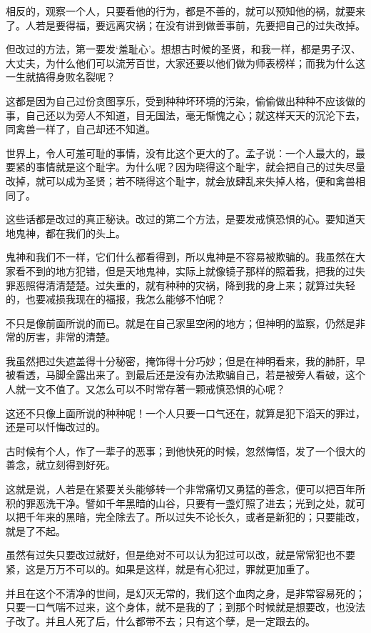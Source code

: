 \documentclass[12pt,twoside,openany]{book}
\begin{document}
相反的，观察一个人，只要看他的行为，都是不善的，就可以预知他的祸，就要来了。人若是要得福，要远离灾祸；在没有讲到做善事前，先要把自己的过失改掉。

但改过的方法，第一要发‘羞耻心’。想想古时候的圣贤，和我一样，都是男子汉、大丈夫，为什么他们可以流芳百世，大家还要以他们做为师表榜样；而我为什么这一生就搞得身败名裂呢？

这都是因为自己过份贪图享乐，受到种种坏环境的污染，偷偷做出种种不应该做的事，自己还以为旁人不知道，目无国法，毫无惭愧之心；就这样天天的沉沦下去，同禽兽一样了，自己却还不知道。

世界上，令人可羞可耻的事情，没有比这个更大的了。孟子说：一个人最大的，最要紧的事情就是这个耻字。为什么呢？因为晓得这个耻字，就会把自己的过失尽量改掉，就可以成为圣贤；若不晓得这个耻字，就会放肆乱来失掉人格，便和禽兽相同了。

这些话都是改过的真正秘诀。改过的第二个方法，是要发戒慎恐惧的心。要知道天地鬼神，都在我们的头上。

鬼神和我们不一样，它们什么都看得到，所以鬼神是不容易被欺骗的。我虽然在大家看不到的地方犯错，但是天地鬼神，实际上就像镜子那样的照着我，把我的过失罪恶照得清清楚楚。过失重的，就有种种的灾祸，降到我的身上来；就算过失轻的，也要减损我现在的福报，我怎么能够不怕呢？

不只是像前面所说的而已。就是在自己家里空闲的地方；但神明的监察，仍然是非常的厉害，非常的清楚。

我虽然把过失遮盖得十分秘密，掩饰得十分巧妙；但是在神明看来，我的肺肝，早被看透，马脚全露出来了。到最后还是没有办法欺骗自己，若是被旁人看破，这个人就一文不值了。又怎么可以不时常存著一颗戒慎恐惧的心呢？

这还不只像上面所说的种种呢！一个人只要一口气还在，就算是犯下滔天的罪过，还是可以忏悔改过的。

古时候有个人，作了一辈子的恶事；到他快死的时候，忽然悔悟，发了一个很大的善念，就立刻得到好死。

这就是说，人若是在紧要关头能够转一个非常痛切又勇猛的善念，便可以把百年所积的罪恶洗干净。譬如千年黑暗的山谷，只要有一盏灯照了进去；光到之处，就可以把千年来的黑暗，完全除去了。所以过失不论长久，或者是新犯的；只要能改，就是了不起。

虽然有过失只要改过就好，但是绝对不可以认为犯过可以改，就是常常犯也不要紧，这是万万不可以的。如果是这样，就是有心犯过，罪就更加重了。

并且在这个不清净的世间，是幻灭无常的，我们这个血肉之身，是非常容易死的；只要一口气喘不过来，这个身体，就不是我的了；到那个时候就是想要改，也没法子改了。并且人死了后，什么都带不去；只有这个孽，是一定跟去的。
\end{document}
